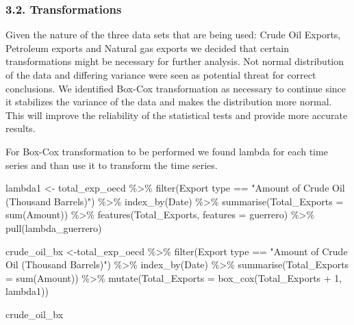 \documentclass[
]{article}
\newenvironment{Shaded}{\begin{snugshade}}{\end{snugshade}}
\newcommand{\AttributeTok}[1]{\textcolor[rgb]{0.77,0.63,0.00}{#1}}
\newcommand{\DecValTok}[1]{\textcolor[rgb]{0.00,0.00,0.81}{#1}}
\newcommand{\FunctionTok}[1]{\textcolor[rgb]{0.00,0.00,0.00}{#1}}
\newcommand{\NormalTok}[1]{#1}
\newcommand{\OtherTok}[1]{\textcolor[rgb]{0.56,0.35,0.01}{#1}}
\newcommand{\SpecialCharTok}[1]{\textcolor[rgb]{0.00,0.00,0.00}{#1}}
\newcommand{\StringTok}[1]{\textcolor[rgb]{0.31,0.60,0.02}{#1}}
\begin{document}
\hypertarget{transformations}{%
\subsubsection{3.2. Transformations}\label{transformations}}

Given the nature of the three data sets that are being used: Crude Oil
Exports, Petroleum exports and Natural gas exports we decided that
certain transformations might be necessary for further analysis. Not
normal distribution of the data and differing variance were seen as
potential threat for correct conclusions. We identified Box-Cox
transformation as necessary to continue since it stabilizes the variance
of the data and makes the distribution more normal. This will improve
the reliability of the statistical tests and provide more accurate
results.

For Box-Cox transformation to be performed we found lambda for each time
series and than use it to transform the time series.

\begin{Shaded}
\begin{Highlighting}[]
\NormalTok{lambda1 }\OtherTok{\textless{}{-}}\NormalTok{ total\_exp\_oecd }\SpecialCharTok{\%\textgreater{}\%} 
  \FunctionTok{filter}\NormalTok{(}\StringTok{\textasciigrave{}}\AttributeTok{Export type}\StringTok{\textasciigrave{}} \SpecialCharTok{==} \StringTok{"Amount of Crude Oil (Thousand Barrels)"}\NormalTok{) }\SpecialCharTok{\%\textgreater{}\%} 
  \FunctionTok{index\_by}\NormalTok{(Date) }\SpecialCharTok{\%\textgreater{}\%} 
  \FunctionTok{summarise}\NormalTok{(}\AttributeTok{Total\_Exports =} \FunctionTok{sum}\NormalTok{(Amount)) }\SpecialCharTok{\%\textgreater{}\%} 
  \FunctionTok{features}\NormalTok{(Total\_Exports, }\AttributeTok{features =}\NormalTok{ guerrero) }\SpecialCharTok{\%\textgreater{}\%} 
  \FunctionTok{pull}\NormalTok{(lambda\_guerrero)}

\NormalTok{crude\_oil\_bx }\OtherTok{\textless{}{-}}\NormalTok{total\_exp\_oecd }\SpecialCharTok{\%\textgreater{}\%} 
  \FunctionTok{filter}\NormalTok{(}\StringTok{\textasciigrave{}}\AttributeTok{Export type}\StringTok{\textasciigrave{}} \SpecialCharTok{==} \StringTok{"Amount of Crude Oil (Thousand Barrels)"}\NormalTok{) }\SpecialCharTok{\%\textgreater{}\%} 
  \FunctionTok{index\_by}\NormalTok{(Date) }\SpecialCharTok{\%\textgreater{}\%} 
  \FunctionTok{summarise}\NormalTok{(}\AttributeTok{Total\_Exports =} \FunctionTok{sum}\NormalTok{(Amount)) }\SpecialCharTok{\%\textgreater{}\%} 
  \FunctionTok{mutate}\NormalTok{(}\AttributeTok{Total\_Exports =} \FunctionTok{box\_cox}\NormalTok{(Total\_Exports }\SpecialCharTok{+} \DecValTok{1}\NormalTok{, lambda1))}

\NormalTok{crude\_oil\_bx}
\end{Highlighting}
\end{Shaded}
\end{document}
